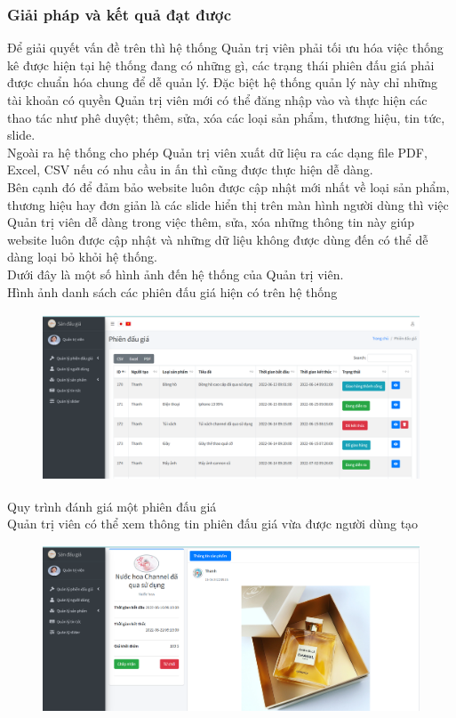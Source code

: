 \documentclass{article}
\begin{document}
\subsubsection{Giải pháp và kết quả đạt được}
Để giải quyết vấn đề trên thì hệ thống Quản trị viên phải tối ưu hóa việc thống kê được hiện tại hệ thống đang có những gì, các trạng thái phiên đấu giá phải được chuẩn hóa chung để dễ quản lý. Đặc biệt hệ thống quản lý này chỉ những tài khoản có quyền Quản trị viên mới có thể đăng nhập vào và thực hiện các thao tác như phê duyệt; thêm, sửa, xóa các loại sản phẩm, thương hiệu, tin tức, slide.\\ 
Ngoài ra hệ thống cho phép Quản trị viên xuất dữ liệu ra các dạng file PDF, Excel, CSV nếu có nhu cầu in ấn thì cũng được thực hiện dễ dàng. \\
Bên cạnh đó để đảm bảo website luôn được cập nhật mới nhất về loại sản phẩm, thương hiệu hay đơn giản là các slide hiển thị trên màn hình người dùng thì việc Quản trị viên dễ dàng trong việc thêm, sửa, xóa những thông tin này giúp website luôn được cập nhật và những dữ liệu không được dùng đến có thể dễ dàng loại bỏ khỏi hệ thống. \\
Dưới đây là một số hình ảnh đến hệ thống của Quản trị viên.\\
Hình ảnh danh sách các phiên đấu giá hiện có trên hệ thống
\begin{figure}[H]
    \centering
    \includegraphics[width=11.4cm,height=5.0cm]{images/adminmanager.png}
\end{figure}
Quy trình đánh giá một phiên đấu giá\\
Quản trị viên có thể xem thông tin phiên đấu giá vừa được người dùng tạo
\begin{figure}[H]
    \centering
    \includegraphics[width=11.4cm,height=4.96cm]{images/adminconfirm.png}
\end{figure}
\end{document}
